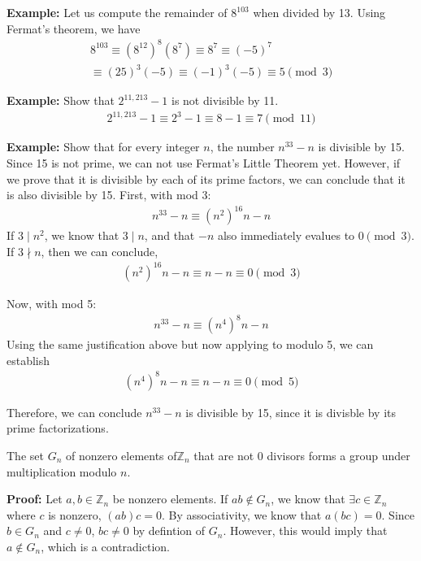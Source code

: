\documentclass[11pt]{article}
\begin{document}
\textbf{Example: } Let us compute the remainder of $8^103$ when divided by 13. Using Fermat's theorem, we have
\begin{align*}
    8^103 \equiv (8^{12})^8(8^7) \equiv 8^7 \equiv (-5)^7\\
    \equiv (25)^3(-5) \equiv (-1)^3(-5) \equiv 5 \pmod{3}
\end{align*}

\textbf{Example: } Show that $2^{11,213} - 1$ is not divisible by 11.
\begin{align*}
    2^{11,213} - 1 \equiv 2^3 - 1 \equiv 8 - 1 \equiv 7 \pmod{11}
\end{align*}

\textbf{Example: } Show that for every integer $n$, the number $n^{33} - n$ is divisible by 15.
Since 15 is not prime, we can not use Fermat's Little Theorem yet. However, if we prove that it is divisible by each of its prime factors, we can conclude that it is also divisible by 15. 
First, with mod 3:
\begin{align*}
    n^{33} - n \equiv (n^2)^{16}n - n
\end{align*}
If $3 \mid n^2$, we know that $3 \mid n$, and that $-n$ also immediately evalues to $0 \pmod{3}$. If $3 \nmid n$, then we can conclude,
\begin{align*}
    (n^2)^{16}n - n \equiv n - n \equiv 0 \pmod{3}
\end{align*}

Now, with mod 5:
\begin{align*}
    n^{33} - n \equiv (n^4)^8n - n
\end{align*}
Using the same justification above but now applying to modulo 5, we can establish
\begin{align*}
    (n^4)^8n  - n \equiv n - n \equiv 0 \pmod{5}
\end{align*}

Therefore, we can conclude $n^{33} - n$ is divisible by 15, since it is divisble by its prime factorizations.


\begin{theorem}
    The set $G_n$ of nonzero elements of$\mathbb{Z}_n$ that are not 0 divisors forms a group under multiplication modulo $n$.
\end{theorem}
\textbf{Proof: }
Let $a,b \in \mathbb{Z}_n$ be nonzero elements. If $ab \not\in G_n$, we know that $\exists c \in \mathbb{Z}_n$ where $c$ is nonzero, $(ab)c = 0$. 
By associativity, we know that $a(bc) = 0$. Since $b \in G_n$ and $c \neq 0$, $bc \neq 0$ by defintion of $G_n$. 
However, this would imply that $a \not\in G_n$, which is a contradiction.
\end{document}
